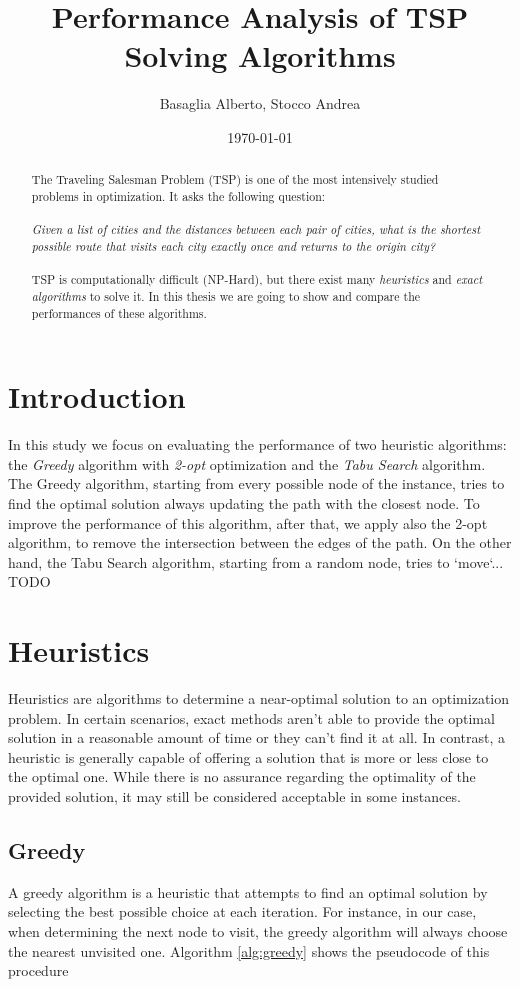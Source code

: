 \documentclass{article}
\title{Performance Analysis of TSP Solving Algorithms}
\author{Basaglia Alberto, Stocco Andrea}
\date{\today}
\begin{document}
\maketitle

\begin{abstract}
	The Traveling Salesman Problem (TSP) is one of the most intensively studied problems in optimization.
	It asks the following question:\\\\
	\textit{Given a list of cities and the distances between each pair of cities, what is the shortest possible route 
	that visits each city exactly once and returns to the origin city?}\\\\
	TSP is computationally difficult (NP-Hard), but there exist many \textit{heuristics} and \textit{exact algorithms} to solve it.
	In this thesis we are going to show and compare the performances of these algorithms. 
\end{abstract}

\section{Introduction}
In this study we focus on evaluating the performance of two heuristic algorithms: the \textit{Greedy} algorithm with \textit{2-opt} 
optimization and the \textit{Tabu Search} algorithm.
The Greedy algorithm, starting from every possible node of the instance, tries to find the optimal solution always updating the path
with the closest node. To improve the performance of this algorithm, after that, we apply also the 2-opt algorithm, to remove 
the intersection between the edges of the path.
On the other hand, the Tabu Search algorithm, starting from a random node, tries to `move`... TODO

\section{Heuristics}
Heuristics are algorithms to determine a near-optimal solution to an optimization problem. In certain scenarios, 
exact methods aren't able to provide the optimal solution in a reasonable amount of time or they can't find it
at all. In contrast, a heuristic is generally capable of offering a solution that is more or less close to
the optimal one.
While there is no assurance regarding the optimality of the provided solution, it may still be considered
acceptable in some instances.

\subsection{Greedy}
A greedy algorithm is a heuristic that attempts to find an optimal solution by selecting the best possible choice at each iteration.
For instance, in our case, when determining the next node to visit, the greedy algorithm will always choose
the nearest unvisited one. Algorithm \ref{alg:greedy} shows the pseudocode of this procedure
\end{document}
